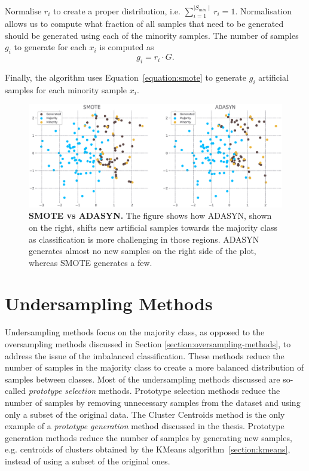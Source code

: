 Normalise $r_i$ to create a proper distribution, i.e. $\sum_{i = 1}^{\mid S_{min} \mid} r_i = 1$.
Normalisation allows us to compute what fraction of all samples that need to be generated should be
generated using each of the minority samples. The number of samples $g_i$ to generate for each
$x_i$ is computed as
\begin{equation}
    g_i = r_i \cdot G.
\end{equation}

Finally, the algorithm uses Equation~\ref{equation:smote} to generate $g_i$ artificial samples for
each minority sample $x_i$.

\begin{figure}
    \centering
    \includegraphics[width=\linewidth]{figures/smote_vs_adasyn.eps}
    \caption{
        \textbf{SMOTE vs ADASYN.} The figure shows how ADASYN, shown on the right, shifts new
        artificial samples towards the majority class as classification is more challenging in
        those regions. ADASYN generates almost no new samples on the right side of the plot,
        whereas SMOTE generates a few.
    }
    \label{figure:smote-vs-adasyn}
\end{figure}


\section{Undersampling Methods}
\label{section:undersampling-methods}

Undersampling methods focus on the majority class, as opposed to the oversampling methods discussed
in Section \ref{section:oversampling-methods}, to address the issue of the imbalanced
classification. These methods reduce the number of samples in the majority class to create a more
balanced distribution of samples between classes. Most of the undersampling methods discussed are
so-called \textit{prototype selection} methods. Prototype selection methods reduce the number of
samples by removing unnecessary samples from the dataset and using only a subset of the original
data. The Cluster Centroids method is the only example of a \textit{prototype generation} method
discussed in the thesis. Prototype generation methods reduce the number of samples by generating
new samples, e.g. centroids of clusters obtained by the KMeans algorithm~\ref{section:kmeans},
instead of using a subset of the original ones.


